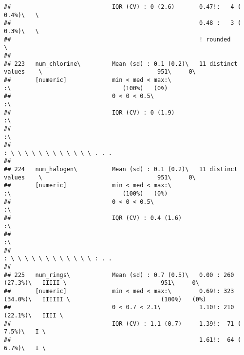 \documentclass[]{article}
\begin{document}
\begin{verbatim}
##                             IQR (CV) : 0 (2.6)       0.47!:   4 ( 0.4%)\   \                                                   
##                                                      0.48 :   3 ( 0.3%)\   \                                                   
##                                                      ! rounded             \                                                   
## 
## 223   num_chlorine\         Mean (sd) : 0.1 (0.2)\   11 distinct values    \                                 951\     0\       
##       [numeric]             min < med < max:\                              :\                                (100%)   (0%)     
##                             0 < 0 < 0.5\                                   :\                                                  
##                             IQR (CV) : 0 (1.9)                             :\                                                  
##                                                                            :\                                                  
##                                                                            : \ \ \ \ \ \ \ \ \ \ \ \ . . .                     
## 
## 224   num_halogen\          Mean (sd) : 0.1 (0.2)\   11 distinct values    \                                 951\     0\       
##       [numeric]             min < med < max:\                              :\                                (100%)   (0%)     
##                             0 < 0 < 0.5\                                   :\                                                  
##                             IQR (CV) : 0.4 (1.6)                           :\                                                  
##                                                                            :\                                                  
##                                                                            : \ \ \ \ \ \ \ \ \ \ \ \ : . .                     
## 
## 225   num_rings\            Mean (sd) : 0.7 (0.5)\   0.00 : 260 (27.3%)\   IIIII \                           951\     0\       
##       [numeric]             min < med < max:\        0.69!: 323 (34.0%)\   IIIIII \                          (100%)   (0%)     
##                             0 < 0.7 < 2.1\           1.10!: 210 (22.1%)\   IIII \                                              
##                             IQR (CV) : 1.1 (0.7)     1.39!:  71 ( 7.5%)\   I \                                                 
##                                                      1.61!:  64 ( 6.7%)\   I \                                                 

\end{verbatim}
\end{document}
